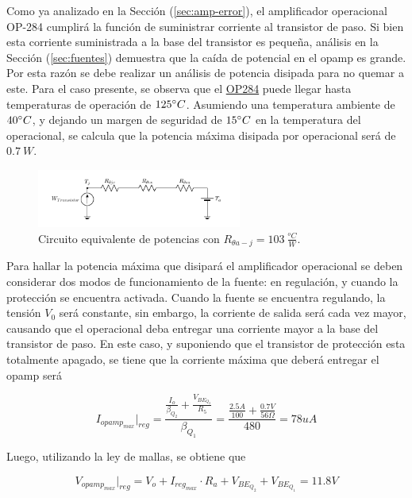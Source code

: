 Como ya analizado en la Sección (\ref{sec:amp-error}), el amplificador operacional OP-284 cumplirá la función de suministrar corriente al transistor de paso. Si bien esta corriente suministrada a la base del transistor es pequeña, análisis en la Sección (\ref{sec:fuentes}) demuestra que la caída de potencial en el opamp es grande. Por esta razón se debe realizar un análisis de potencia disipada para no quemar a este. Para el caso presente, se observa que el \href{https://www.alldatasheet.com/datasheet-pdf/pdf/49039/AD/OP284.html}{OP284} puede llegar hasta temperaturas de operación de $125 \degree C$. Asumiendo una temperatura ambiente de $40 \degree C$, y dejando un margen de seguridad de $15\degree C$ en la temperatura del operacional, se calcula que la potencia máxima disipada por operacional será de $0.7 \ W$.
\begin{figure}[H]
\centering
	\includegraphics[width=0.6\textwidth, page=2]{ImagenesEjercicio2/Potencia.pdf}
	\caption{Circuito equivalente de potencias con $R_{\theta a-j} = 103 \ \frac{^o C}{W}$.}
	\label{fig:circuitopot}
\end{figure}

Para hallar la potencia máxima que disipará el amplificador operacional se deben considerar dos modos de funcionamiento de la fuente: en regulación, y cuando la protección se encuentra activada. Cuando la fuente se encuentra regulando, la tensión $V_0$ será constante, sin embargo, la corriente de salida será cada vez mayor, causando que el operacional deba entregar una corriente mayor a la base del transistor de paso. En este caso, y suponiendo que el transistor de protección esta totalmente apagado, se tiene que la corriente máxima que deberá entregar el opamp será

\begin{equation}
I_{opamp_{max}}|_{reg} = \frac{\frac{I_{o}}{\beta_{Q_2}}+\frac{V_{BE_{Q_2}}}{R_5}}{\beta_{Q_1}} =  \frac{\frac{2.5A}{100}+\frac{0.7V}{56\Omega}}{480} = 78uA
\end{equation}

Luego, utilizando la ley de mallas, se obtiene que

\begin{equation}
V_{opamp_{max}}|_{reg} = V_o + I_{reg_{max}} \cdot R_a + V_{BE_{Q_2}} + V_{BE_{Q_1}} = 11.8V
\end{equation}

